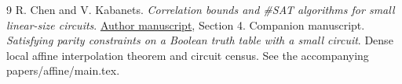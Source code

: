 \documentclass[11pt]{article}
\begin{document}
\begin{thebibliography}{9}
 R. Chen and V. Kabanets. \emph{Correlation bounds and \#SAT algorithms for small linear-size circuits}. \href{https://www2.cs.sfu.ca/~kabanets/papers/linsize-eccc.pdf}{Author manuscript}, Section 4.
 Companion manuscript. \emph{Satisfying parity constraints on a Boolean truth table with a small circuit}. Dense local affine interpolation theorem and circuit census. See the accompanying \textnormal{papers/affine/main.tex}.
\end{thebibliography}
\end{document}
